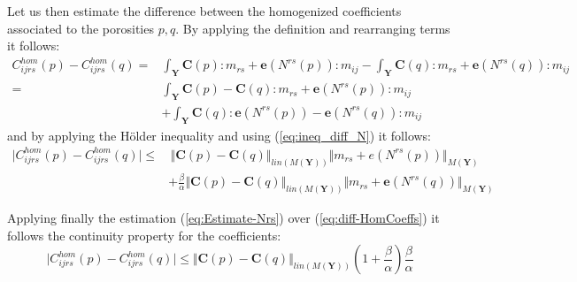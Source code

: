 Let us then estimate the difference between the homogenized coefficients associated to the porosities $p, q$. By applying the definition and rearranging terms it follows:
\begin{equation*}
    \begin{aligned}
        C^{hom}_{ijrs}(p) - C^{hom}_{ijrs}(q) = & \int_{\mathbf{Y}} \mathbf{C}(p):m_{rs} + \mathbf{e}(N^{rs}(p)):m_{ij} - \int_{\mathbf{Y}} \mathbf{C}(q):m_{rs} + \mathbf{e}(N^{rs}(q)):m_{ij}\\
        = & \int_{\mathbf{Y}} \mathbf{C}(p) - \mathbf{C}(q):m_{rs} + \mathbf{e}(N^{rs}(p)):m_{ij} \\
        & + \int_{\mathbf{Y}} \mathbf{C}(q):\mathbf{e}(N^{rs}(p)) - \mathbf{e}(N^{rs}(q)):m_{ij} 
    \end{aligned}
\end{equation*}
and by applying the H\"{o}lder inequality and using (\ref{eq:ineq_diff_N}) it follows:
\begin{equation}
    \label{eq:diff-HomCoeffs}
    \begin{aligned}
        \vert C^{hom}_{ijrs}(p) - C^{hom}_{ijrs}(q)\vert \leq & \, \Vert \mathbf{C}(p)-\mathbf{C}(q) \Vert_{lin(M(\mathbf{Y}))} \Vert m_{rs}+e(N^{rs}(p)) \Vert_{M(\mathbf{Y})} \\
         & +  \frac{\beta}{\alpha} \Vert \mathbf{C}(p)-\mathbf{C}(q) \Vert_{lin(M(\mathbf{Y}))} \Vert m_{rs}+\mathbf{e}(N^{rs}(q)) \Vert_{M(\mathbf{Y})} 
    \end{aligned}
\end{equation}

Applying finally the estimation (\ref{eq:Estimate-Nrs}) over (\ref{eq:diff-HomCoeffs}) it follows the continuity property for the coefficients:
\begin{equation}
    \label{ContinuityPropHom}
    \vert C^{hom}_{ijrs}(p) - C^{hom}_{ijrs}(q)\vert \leq \Vert \mathbf{C}(p) - \mathbf{C}(q) \Vert_{lin(M(\mathbf{Y}))} (1+\frac{\beta}{\alpha})\frac{\beta}{\alpha}
\end{equation}

